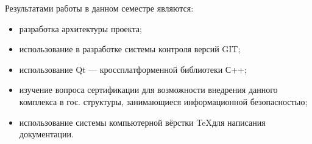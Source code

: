 Результатами работы в данном семестре являются:

\begin{itemize}
\item разработка архитектуры проекта;
\item использование в разработке системы контроля версий GIT;
\item использование Qt --- кроссплатформенной библиотеки С++;
\item изучение вопроса сертификации для возможности внедрения данного комплекса в гос. структуры, занимающиеся информационной безопасностью;
\item использование системы компьютерной вёрстки \TeX для написания документации.
\end{itemize}
